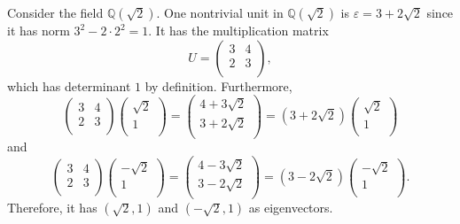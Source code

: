 \begin{example}
  \label{ex:sqrt2-unit}
  Consider the field $ℚ(\sqrt{2})$.
  One nontrivial unit in $ℚ(\sqrt{2})$ is $ε = 3 + 2\sqrt{2}$
  since it has norm $3^2 - 2 · 2^2 = 1$.
  It has the multiplication matrix
  \[
    U = \begin{pmatrix}
      3 & 4 \\
      2 & 3 \\
    \end{pmatrix},
  \]
  which has determinant $1$ by definition.
  Furthermore,
  \[
    \begin{pmatrix}
      3 & 4 \\
      2 & 3 \\
    \end{pmatrix}
    \begin{pmatrix}
      \sqrt{2} \\ 1 \\
    \end{pmatrix}
    =
    \begin{pmatrix}
      4 + 3\sqrt{2} \\
      3 + 2\sqrt{2} \\
    \end{pmatrix}
    =
    (3 + 2\sqrt{2})
    \begin{pmatrix}
      \sqrt{2} \\ 1 \\
    \end{pmatrix}
  \]
  and
  \[
    \begin{pmatrix}
      3 & 4 \\
      2 & 3 \\
    \end{pmatrix}
    \begin{pmatrix}
      -\sqrt{2} \\ 1 \\
    \end{pmatrix}
    =
    \begin{pmatrix}
      4 - 3\sqrt{2} \\
      3 - 2\sqrt{2} \\
    \end{pmatrix}
    =
    (3 - 2\sqrt{2})
    \begin{pmatrix}
      -\sqrt{2} \\ 1 \\
    \end{pmatrix}.
  \]
  Therefore, it has $(\sqrt{2}, 1)$ and $(-\sqrt{2}, 1)$ as eigenvectors.
\end{example}

